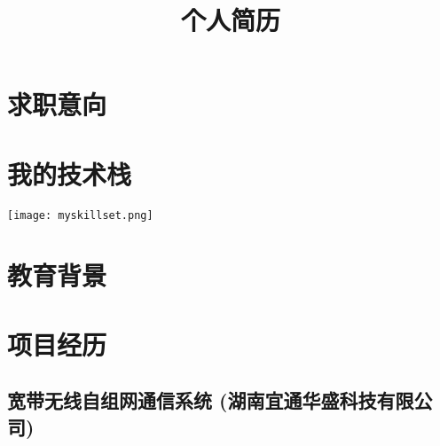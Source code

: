 \documentclass[10pt,a4paper,sans]{moderncv} %
\title{个人简历}
\begin{document}
\makecvtitle %

\section{求职意向}



\section{我的技术栈}
\begin{center}
\texttt{[image: myskillset.png]}    
\end{center}

  

\section{教育背景}



\section{项目经历}
\subsection{宽带无线自组网通信系统 (湖南宜通华盛科技有限公司)}
\end{document}

